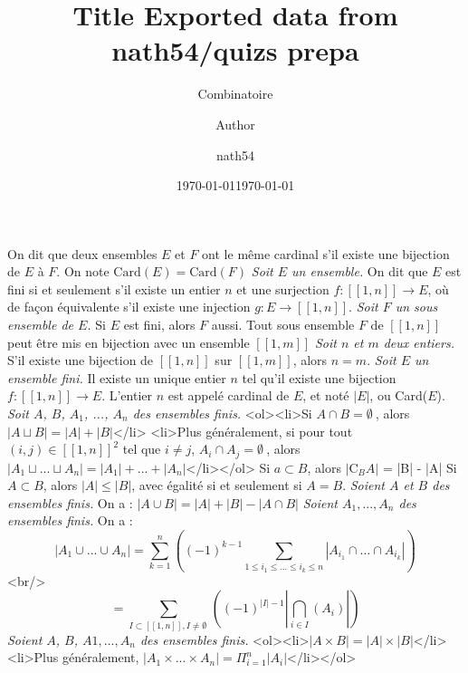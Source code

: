 \documentclass[11pt]{article}
\title{ Title}
\author{ Author }
\date{\today}
\begin{document}
\title{ Exported data from nath54/quizs prepa}
\author{ nath54}
\date{\today}


 \subtitle{Combinatoire}

\textit{  }
On dit que deux ensembles $E$ et $F$ ont le même cardinal s'il existe une bijection de $E$ à $F$. On note $\text{Card}(E) = \text{Card}(F)$
\textit{ Soit $E$ un ensemble. }
On dit que $E$ est fini si et seulement s'il existe un entier $n$ et une surjection $f: [\![1,n]\!] \rightarrow E$, où de façon équivalente s'il existe une injection $g : E \rightarrow [\![1,n]\!]$.
\textit{ Soit $F$ un sous ensemble de $E$. }
Si $E$ est fini, alors $F$ aussi.
\textit{  }
Tout sous ensemble $F$ de $[\![1, n]\!]$ peut être mis en bijection avec un ensemble $[\![1, m]\!]$
\textit{ Soit $n$ et $m$ deux entiers. }
S'il existe une bijection de $[\![1, n]\!]$ sur $[\![1, m]\!]$, alors $n = m$.
\textit{ Soit $E$ un ensemble fini. }
Il existe un unique entier $n$ tel qu'il existe une bijection $f: [\![1,n]\!] \rightarrow E$. L'entier $n$ est appelé cardinal de $E$, et noté $|E|$, ou Card($E$).
\textit{ Soit $A$, $B$, $A_1$, ..., $A_n$ des ensembles finis. }
<ol><li>Si $A \cap B = \emptyset\ $, alors $|A \sqcup B| = |A| + |B|$</li> <li>Plus généralement, si pour tout $(i, j) \in [\![1, n]\!]^2$ tel que $i \neq j$, $A_i \cap A_j = \emptyset\ $, alors $|A_1 \sqcup ... \sqcup A_n| = |A_1| + ... + |A_n|$</li></ol>
\textit{  }
Si $a \subset B$, alors $|\text{C}_BA|$ = |B| - |A|
\textit{  }
Si $A \subset B$, alors $|A| \leqslant |B|$, avec égalité si et seulement si $A=B$.
\textit{ Soient $A$ et $B$ des ensembles finis. }
On a : $|A \cup B| = |A| + |B| - |A \cap B|$
\textit{ Soient $A_1, ..., A_n$ des ensembles finis. }
On a : $$|A_1 \cup ... \cup A_n| = \sum_{k=1}^{n}( (-1)^{k-1} \sum_{1 \leqslant i_{1} \leqslant ... \leqslant i_{k} \leqslant n} |A_{i_1} \cap \ldots\! \cap A_{i_k}|)$$ <br/> $$ = \sum_{I \subset [\![1,n]\!], I \neq \emptyset\ }((-1)^{|I|-1}|\bigcap_{i \in I}(A_i)|)$$
\textit{ Soient $A$, $B$, $A1,...,A_n$ des ensembles finis. }
<ol><li>$|A \times B| = |A| \times |B|$</li> <li>Plus généralement, $|A_1 \times ... \times A_n| = \Pi_{i=1}^n|A_i|$</li></ol>
\end{document}
